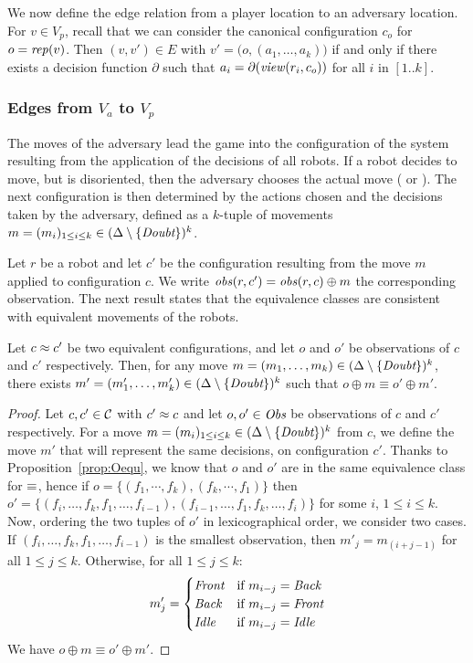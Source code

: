 We now define the edge relation from a player location to an adversary
location. For $v\in V_p$, recall that we can consider the canonical configuration $c_o$ for $o=\mathit{rep}(v)$. 
Then $(v, v')\in E$ with $v'=\bigl (o, (a_1, \dots, a_k)\bigr )$ if and only if there exists 
a decision function $\partial$ such that $a_i=\partial(\mathit{view}(r_i, c_o))$ for all $i$ in  $[1.. k]$.


\subsubsection{Edges from $V_a$ to $V_p$}
The moves of the adversary lead the game into the configuration of 
the system resulting from the application of the decisions of all robots. 
If a robot decides to move, but is disoriented, then the adversary
chooses the actual move (\clockwise{} or \counterclockwise). 
The next configuration is then determined by the actions chosen 
and the decisions taken by the adversary, defined as a $k$-tuple of movements
$m= (m_i)_{1\leq i \leq k} \in (\Delta \setminus \{\textit{Doubt}\})^k$.

Let $r$ be a robot and let $c'$ be the configuration resulting from the move $m$ applied
to configuration $c$. We write $\mathit{obs}(r, c') = \mathit{obs}(r, c) \oplus m$ the corresponding 
observation. The next result states that the equivalence classes are consistent 
with equivalent movements of the robots. 
 \begin{proposition}
 \label{prop: bisim}
 Let $c \approx c'$ be two equivalent configurations, and let $o$ and 
 $o'$ be observations of $c$ and $c'$ respectively.
 Then, for any move $m = (m_1, \dots, m_k)\in(\Delta \setminus \{\textit{Doubt}\})^k$, there  
 exists $m' = (m'_1, \dots, m'_k)\in(\Delta \setminus \{\textit{Doubt}\})^k$
  such that  $o\oplus m \equiv o'\oplus m'$.
 \end{proposition}
  \begin{proof}
 Let $c, c' \in \mathcal{C}$ with
 $c'\approx c$ and let $o, o' \in \textit{Obs}$ be observations of $c$ and $c'$ respectively. 
 For a  move $m=(m_i)_{1\leq i \leq k}\in (\Delta \setminus \{\textit{Doubt}\})^k$ from $c$, 
 we define the move $m'$ that will represent the same decisions, on 
 configuration $c'$. Thanks to Proposition~\ref{prop:Oequ}, 
 we know that $o$ and $o'$ are in the same equivalence class for $\equiv$, hence 
if $o=\{(f_1, \cdots, f_k), (f_k, \cdots, f_1)\}$ then $o'=\{(f_i, \dots, f_k, f_1, \dots, f_{i-1}), (f_{i-1}, \dots, f_1, f_k, \dots, f_{i})\}$ 
for some $i$, $1\leq i\leq k$.
Now, ordering the two tuples of $o'$ in lexicographical order, we consider two cases.
If $(f_i, \dots, f_k, f_1, \dots, f_{i-1})$ is the smallest observation, then
 $m'_j=m_{(i+j-1)}$ for all $1\leq j\leq k$. Otherwise,  for all $1\leq j\leq k$:  
 $$m'_j= \begin{cases}
 \textit{Front} &\textrm{if }m_{i-j}=\textit{Back}\\
 \textit{Back} &\textrm{if }m_{i-j}=\textit{Front}\\
 \textit{Idle} &\textrm{if }m_{i-j}=\textit{Idle}
 \end{cases}$$
  We have $o\oplus m \equiv o'\oplus m'$.
 \end{proof}
 
